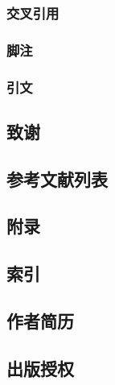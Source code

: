 \subsubsection{交叉引用}

\subsubsection{脚注}

\subsubsection{引文}

\subsection{致谢}

\subsection{参考文献列表}

\subsection{附录}

\subsection{索引}

\subsection{作者简历}

\subsection{出版授权}



